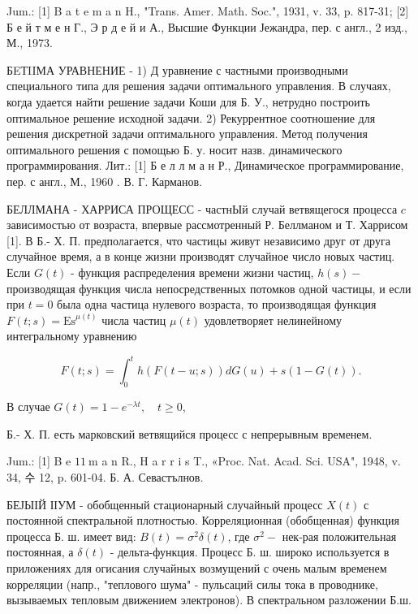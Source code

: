 \documentclass[10pt]{article}
\begin{document}
Jum.: [1] B a t e m a n H., "Trans. Amer. Math. Soc.", 1931, v. 33, p. 817-31; [2] Б е й т м е н Г., Э р д е й и А., Высшие Функции Јежандра, пер. с англ., 2 изд., М., 1973.



БEТIIМА УРАВНЕНИЕ - 1) Д уравнение с частными производными специального типа для решения задачи оптимального управления. В случаях, когда удается найти решение задачи Коши для Б. У., нетрудно построить оптимальное решение исходной задачи. 2) Рекуррентное соотношение для решения дискретной задачи оптимального управления. Метод получения оптимального решения с помощью Б. у. носит назв. динамического программирования. Лит.: [1] Б е л л м а н Р., Динамическое программирование, пер. с англ., М., 1960 . В. Г. Карманов.



БЕЛЛМАНА - ХАРРИСА ПРОЩЕСС - частнЫй случай ветвящегося процесса $c$ зависимостью от возраста, впервые рассмотренный Р. Беллманом и Т. Харрисом [1]. В Б.- Х. П. предполагается, что частицы живут независимо друг от друга случайное время, а в конце жизни производят случайное число новых частиц. Если $G(t)$ - функция распределения времени жизни частиц, $h(s)-$ производящая функция числа непосредственных потомков одной частицы, и если при $t=0$ была одна частица нулевого возраста, то производящая функция $F(t ; s)=\mathrm{Es}^{\mu(t)}$ числа частиц $\mu(t)$ удовлетворяет нелинейному интегральному уравнению



\[

F(t ; s)=\int_{0}^{t} h(F(t-u ; s)) d G(u)+s(1-G(t)) .

\]



В случае $G(t)=1-e^{-\lambda t}, \quad t \geqslant 0$,



Б.- Х. П. есть марковский ветвящийся процесс с непрерывным временем.



Jum.: [1] B e $11 \mathrm{~m}$ a n R., H a r r i s T., «Proc. Nat. Acad. Sci. USA", 1948, v. 34, 수 12, p. 601-04. Б. А. Севастълнов.



БЕЈЫІЙ ІІУМ - обобщенный стационарный случайный процесс $X(t)$ с постоянной спектральной плотностью. Корреляционная (обобщенная) функция процесса Б. ш. имеет вид: $B(t)=\sigma^{2} \delta(t)$, где $\sigma^{2}-$ нек-рая положительная постоянная, а $\delta(t)$ - дельта-функция. Процесс Б. ш. широко используется в приложениях для огисания случайных возмущений с очень малым временем корреляции (напр., "теплового шума" - пульсаций силы тока в проводнике, вызываемых тепловым движением электронов). В спектральном разложении Б.ш.
\end{document}
